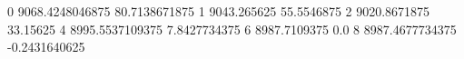 0 9068.4248046875 80.7138671875
1 9043.265625 55.5546875
2 9020.8671875 33.15625
4 8995.5537109375 7.8427734375
6 8987.7109375 0.0
8 8987.4677734375 -0.2431640625
